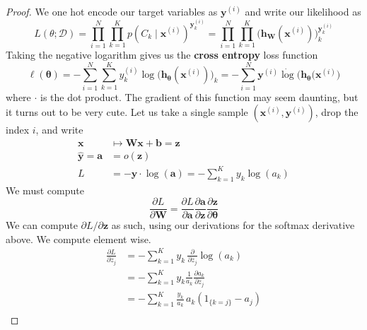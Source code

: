   \begin{theorem}
    
  \end{theorem}
  \begin{proof}
    We one hot encode our target variables as $\mathbf{y}^{(i)}$ and write our likelihood as 
    \begin{equation}
      L(\theta; \mathcal{D}) = \prod_{i=1}^N \prod_{k=1}^K p(C_k \mid \mathbf{x}^{(i)})^{\mathbf{y}^{(i)}_k} = \prod_{i=1}^N \prod_{k=1}^K \big( \mathbf{h}_\mathbf{W} (\mathbf{x}^{(i)})\big)_k^{\mathbf{y}_k^{(i)}}
    \end{equation}
    Taking the negative logarithm gives us the \textbf{cross entropy} loss function
    \begin{equation}
      \ell (\boldsymbol{\theta}) = - \sum_{i=1}^N \sum_{k=1}^K y^{(i)}_k \log \big( \mathbf{h}_{\boldsymbol{\theta}} (\mathbf{x}^{(i)})\big)_k = - \sum_{i=1}^N \mathbf{y}^{(i)} \dot \log \big( \mathbf{h}_{\boldsymbol{\theta}} (\mathbf{x}^{(i)} \big)
    \end{equation}
    where $\cdot$ is the dot product. The gradient of this function may seem daunting, but it turns out to be very cute. Let us take a single sample $(\mathbf{x}^{(i)}, \mathbf{y}^{(i)})$, drop the index $i$, and write
    \begin{align*}
      \mathbf{x} & \mapsto \mathbf{W} \mathbf{x} + \mathbf{b} = \mathbf{z} \\
      \hat{\mathbf{y}} = \mathbf{a} & = o (\mathbf{z}) \\
      L & = - \mathbf{y} \cdot \log (\mathbf{a}) = - \sum_{k=1}^K y_k \log(a_k)
    \end{align*}
    We must compute 
    \begin{equation}
      \frac{\partial L}{\partial \mathbf{W}} = \frac{\partial L}{\partial \mathbf{a}} \frac{\partial \mathbf{a}}{\partial \mathbf{z}} \frac{\partial \mathbf{z}}{\partial \boldsymbol{\theta}}
    \end{equation}
    We can compute $\partial L /\partial \mathbf{z}$ as such, using our derivations for the softmax derivative above. We compute element wise. 
    \begin{align*}
      \frac{\partial L}{\partial z_j} & = - \sum_{k=1}^K y_k \, \frac{\partial}{\partial z_j} \log (a_k) \\
      & = - \sum_{k=1}^K y_k \frac{1}{a_k} \frac{\partial a_k}{\partial z_j} \\
      & = - \sum_{k=1}^K \frac{y_k}{a_k} \, a_k (1_{\{k = j\}} - a_j) \\

\end{align*}
\end{proof}
